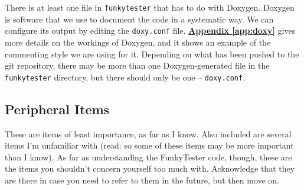 \documentclass{report}
\begin{document}
There is at least one file in \texttt{funkytester} that has to do with Doxygen. Doxygen is software that we use to document the code in a systematic way. We can configure its output by editing the \texttt{doxy.conf} file. \hyperref[app:doxy]{\textbf{Appendix \ref{app:doxy}}} gives more details on the workings of Doxygen, and it shows an example of the commenting style we are using for it. Depending on what has been pushed to the git repository, there may be more than one Doxygen-generated file in the \texttt{funkytester} directory, but there should only be one -- \texttt{doxy.conf}.

\subsection{Peripheral Items}
These are items of least importance, as far as I know. Also included are several items I'm unfamiliar with (read: so some of these items may be more important than I know). As far as understanding the FunkyTester code, though, these are the items you shouldn't concern yourself too much with. Acknowledge that they are there in case you need to refer to them in the future, but then move on.
\end{document}
